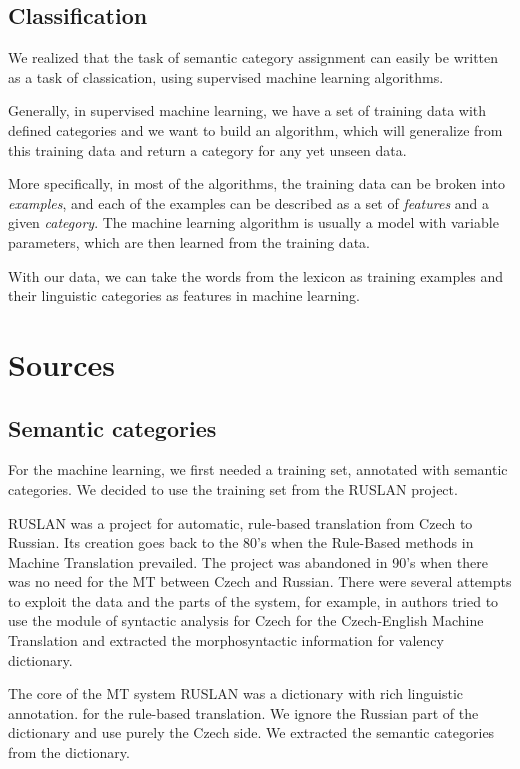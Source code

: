 \documentclass[letterpaper]{article}
\begin{document}
\subsection{Classification}
We realized that the task of semantic category assignment can easily be written as a task of classication, 
using supervised machine learning algorithms.

Generally, in supervised machine learning, we have a set of training data with defined 
categories and we want to build an algorithm, which will generalize from this training data and return a category for any yet unseen data.

More specifically, in most of the algorithms, the training data can be broken into
\textit{examples}, and each of the examples can be described as a set of \textit{features} and a given \textit{category}. The machine learning algorithm is usually a model with variable parameters, which are then learned from the training data.


With our data, we can take the words from the lexicon as training examples 
and their linguistic categories as features in machine learning.



\section{Sources}
\subsection{Semantic categories}
For the machine learning, we first needed a training set, annotated with semantic categories. 
We decided to use the training set from the RUSLAN project.


RUSLAN was a project for automatic, rule-based translation from Czech to Russian. 
Its creation \cite{oliva1989parser} goes back to the 80's when the Rule-Based 
methods in Machine Translation prevailed.  The project was abandoned in 90's when
there was no need for the MT between Czech and Russian. There were
several attempts to exploit the data and the parts of the system, for
example, in \cite{mt-recycled} authors tried to use the module
of syntactic analysis for Czech for the Czech-English Machine Translation
and \cite{pisa2010} extracted the morphosyntactic information for
valency dictionary.

The core of the MT system RUSLAN was a dictionary with rich linguistic annotation.
for the rule-based translation. We ignore the Russian 
part of the dictionary and use purely the Czech side. We extracted the 
semantic categories from the dictionary. 
\end{document}
